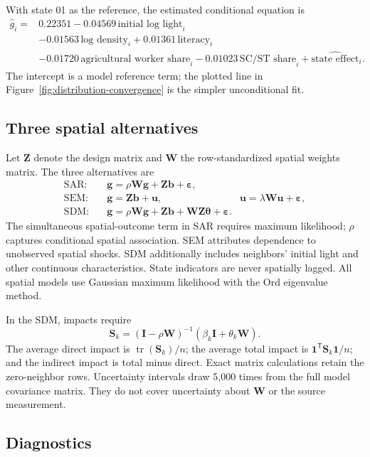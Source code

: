 \documentclass[11pt]{article}
\newcommand{\V}[1]{\mathbf{#1}}
\newcommand{\W}{\mathbf{W}}
\begin{document}
With state 01 as the reference, the estimated conditional equation is
\begin{align*}
  \widehat{g}_i={}&0.22351
  -0.04569\,\text{initial log light}_i \\
  &-0.01563\,\text{log density}_i
  +0.01361\,\text{literacy}_i \\
  &-0.01720\,\text{agricultural worker share}_i
  -0.01023\,\text{SC/ST share}_i
  +\widehat{\text{state effect}}_i.
\end{align*}
The intercept is a model reference term; the plotted line in
Figure~\ref{fig:distribution-convergence} is the simpler unconditional fit.

\subsection{Three spatial alternatives}

Let $\V{Z}$ denote the design matrix and $\W$ the row-standardized spatial
weights matrix. The three alternatives are
\begin{align}
  \text{SAR:}\quad & \V{g}=\rho\W\V{g}+\V{Z}\V{b}+\V{\varepsilon}, \\
  \text{SEM:}\quad & \V{g}=\V{Z}\V{b}+\V{u},
    & \V{u}=\lambda\W\V{u}+\V{\varepsilon}, \\
  \text{SDM:}\quad & \V{g}=\rho\W\V{g}+\V{Z}\V{b}
    +\W\V{Z}\V{\theta}+\V{\varepsilon}.
\end{align}
The simultaneous spatial-outcome term in SAR requires maximum likelihood;
$\rho$ captures conditional spatial association. SEM attributes dependence to
unobserved spatial shocks. SDM additionally includes neighbors' initial light
and other continuous characteristics. State indicators are never spatially
lagged. All spatial models use Gaussian maximum likelihood with the Ord
eigenvalue method.

In the SDM, impacts require
\[
  \V{S}_k=(\V{I}-\rho\W)^{-1}(\beta_k\V{I}+\theta_k\W).
\]
The average direct impact is $\operatorname{tr}(\V{S}_k)/n$; the average total
impact is $\V{1}^{\mathsf T}\V{S}_k\V{1}/n$; and the indirect impact is total
minus direct. Exact matrix calculations retain the zero-neighbor rows.
Uncertainty intervals draw 5,000 times from the full model covariance matrix.
They do not cover uncertainty about $\W$ or the source measurement.

\subsection{Diagnostics}
\end{document}
